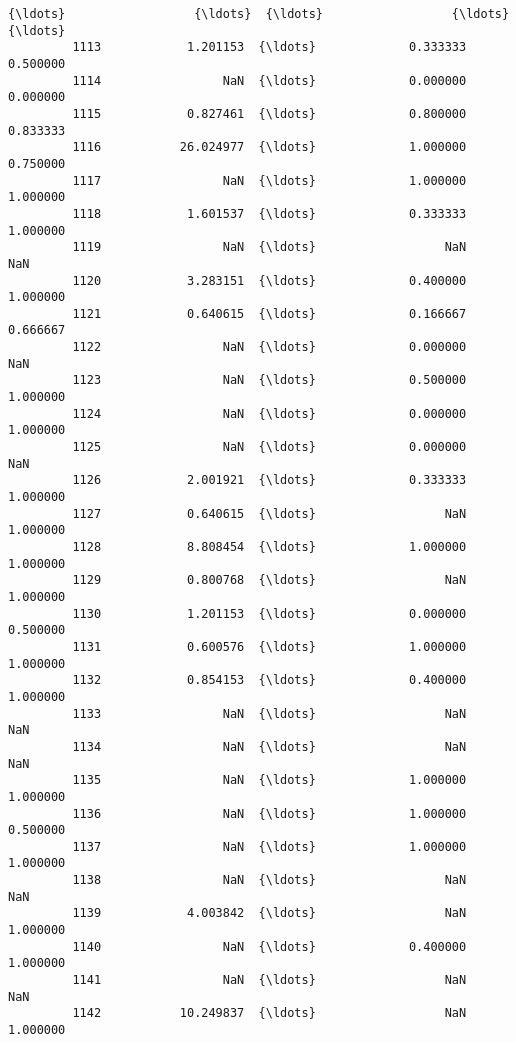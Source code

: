 \documentclass[11pt]{article}
\begin{document}
\begin{Verbatim}[commandchars=\\\{\}]
         {\ldots}                  {\ldots}  {\ldots}                  {\ldots}              {\ldots}   
         1113            1.201153  {\ldots}             0.333333         0.500000   
         1114                 NaN  {\ldots}             0.000000         0.000000   
         1115            0.827461  {\ldots}             0.800000         0.833333   
         1116           26.024977  {\ldots}             1.000000         0.750000   
         1117                 NaN  {\ldots}             1.000000         1.000000   
         1118            1.601537  {\ldots}             0.333333         1.000000   
         1119                 NaN  {\ldots}                  NaN              NaN   
         1120            3.283151  {\ldots}             0.400000         1.000000   
         1121            0.640615  {\ldots}             0.166667         0.666667   
         1122                 NaN  {\ldots}             0.000000              NaN   
         1123                 NaN  {\ldots}             0.500000         1.000000   
         1124                 NaN  {\ldots}             0.000000         1.000000   
         1125                 NaN  {\ldots}             0.000000              NaN   
         1126            2.001921  {\ldots}             0.333333         1.000000   
         1127            0.640615  {\ldots}                  NaN         1.000000   
         1128            8.808454  {\ldots}             1.000000         1.000000   
         1129            0.800768  {\ldots}                  NaN         1.000000   
         1130            1.201153  {\ldots}             0.000000         0.500000   
         1131            0.600576  {\ldots}             1.000000         1.000000   
         1132            0.854153  {\ldots}             0.400000         1.000000   
         1133                 NaN  {\ldots}                  NaN              NaN   
         1134                 NaN  {\ldots}                  NaN              NaN   
         1135                 NaN  {\ldots}             1.000000         1.000000   
         1136                 NaN  {\ldots}             1.000000         0.500000   
         1137                 NaN  {\ldots}             1.000000         1.000000   
         1138                 NaN  {\ldots}                  NaN              NaN   
         1139            4.003842  {\ldots}                  NaN         1.000000   
         1140                 NaN  {\ldots}             0.400000         1.000000   
         1141                 NaN  {\ldots}                  NaN              NaN   
         1142           10.249837  {\ldots}                  NaN         1.000000   
         

\end{Verbatim}
\end{document}
